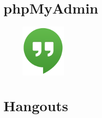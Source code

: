 \section{phpMyAdmin}

\begin{figure}
  \begin{center}
    \includegraphics[width=0.2\textwidth] {bilder/hangouts}
  \end{center}
\end{figure}
\section{Hangouts}
